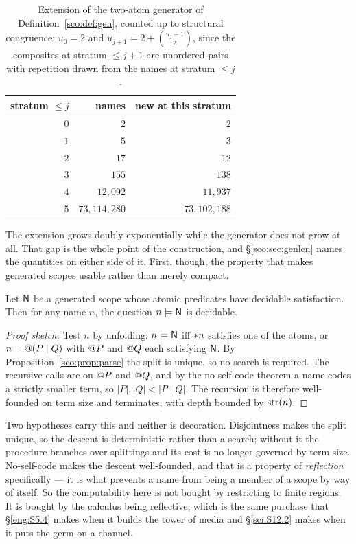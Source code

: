 \begin{table}[t]
\centering
\begin{tabular}{rrr}
\toprule
stratum $\le j$ & names & new at this stratum \\
\midrule
$0$ & $2$      & $2$ \\
$1$ & $5$      & $3$ \\
$2$ & $17$     & $12$ \\
$3$ & $155$    & $138$ \\
$4$ & $12{,}092$ & $11{,}937$ \\
$5$ & $73{,}114{,}280$ & $73{,}102{,}188$ \\
\bottomrule
\end{tabular}
\caption{Extension of the two-atom generator of
Definition~\ref{sco:def:gen}, counted up to structural congruence:
$u_0 = 2$ and $u_{j+1} = 2 + \binom{u_j+1}{2}$, since the composites at
stratum $\le j+1$ are unordered pairs with repetition drawn from the names
at stratum $\le j$.}
\label{sco:tab:growth}
\end{table}

The extension grows doubly exponentially while the generator does not grow
at all. That gap is the whole point of the construction, and
\S\ref{sco:sec:genlen} names the quantities on either side of it. First,
though, the property that makes generated scopes usable rather than merely
compact.

\begin{proposition}
\label{sco:prop:descent}
Let $\mathsf{N}$ be a generated scope whose atomic predicates have decidable
satisfaction. Then for any name $n$, the question $n \models \mathsf{N}$ is
decidable.
\end{proposition}

\begin{proof}[Proof sketch]
Test $n$ by unfolding: $n \models \mathsf{N}$ iff $*n$ satisfies one of
the atoms, or $n = @(P \mid Q)$ with $@P$ and $@Q$ each
satisfying $\mathsf{N}$. By Proposition~\ref{sco:prop:parse} the split is
unique, so no search is required. The recursive calls are on $@P$ and
$@Q$, and by the no-self-code theorem \cite{RHO} a name codes a
strictly smaller term, so $|P|, |Q| < |P \mid Q|$. The recursion is
therefore well-founded on term size and terminates, with depth bounded by
$\mathrm{str}(n)$.
\end{proof}

\begin{remark}
\label{sco:rmk:whatworks}
Two hypotheses carry this and neither is decoration. Disjointness makes
the split unique, so the descent is deterministic rather than a search;
without it the procedure branches over splittings and its cost is no
longer governed by term size. No-self-code makes the descent
well-founded, and that is a property of \emph{reflection} specifically ---
it is what prevents a name from being a member of a scope by way of
itself. So the computability here is not bought by restricting to finite
regions. It is bought by the calculus being reflective, which is the same
purchase that \S\ref{eng:S5.4} makes when it builds the tower of media and
\S\ref{sci:S12.2} makes when it puts the germ on a channel.
\end{remark}

